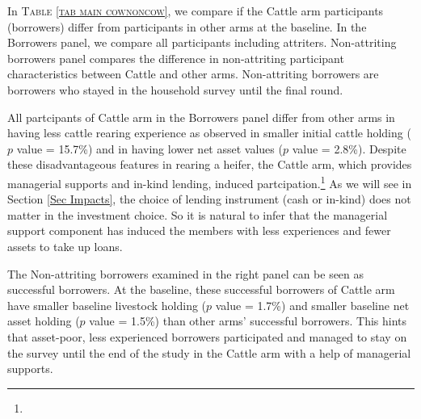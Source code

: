 	In \textsc{\small Table \ref{tab main cownoncow}}, we compare if the \textsf{Cattle} arm participants (borrowers) differ from participants in other arms at the baseline. In the \textsf{Borrowers} panel, we compare all participants including attriters. \textsf{Non-attriting borrowers} panel compares the difference in non-attriting participant characteristics between \textsf{Cattle} and other arms. Non-attriting borrowers are borrowers who stayed in the household survey until the final round. 

	All partcipants of \textsf{Cattle} arm in the \textsf{Borrowers} panel differ from other arms in having less cattle rearing experience as observed in smaller initial cattle holding ($p$ value = 15.7\%) and in having lower net asset values ($p$ value = 2.8\%). Despite these disadvantageous features in rearing a heifer, the \textsf{Cattle} arm, which provides managerial supports and in-kind lending, induced partcipation.\footnote{ } As we will see in Section \ref{Sec Impacts}, the choice of lending instrument (cash or in-kind) does not matter in the investment choice. So it is natural to infer that the managerial support component has induced the members with less experiences and fewer assets to take up loans. 

	The \textsf{Non-attriting borrowers} examined in the right panel can be seen as successful borrowers. At the baseline, these successful borrowers of \textsf{Cattle} arm have smaller baseline livestock holding ($p$ value = 1.7\%) and smaller baseline net asset holding ($p$ value = 1.5\%) than other arms' successful borrowers. %
This hints that asset-poor, less experienced borrowers participated and managed to stay on the survey until the end of the study in the \textsf{Cattle} arm with a help of managerial supports.  

